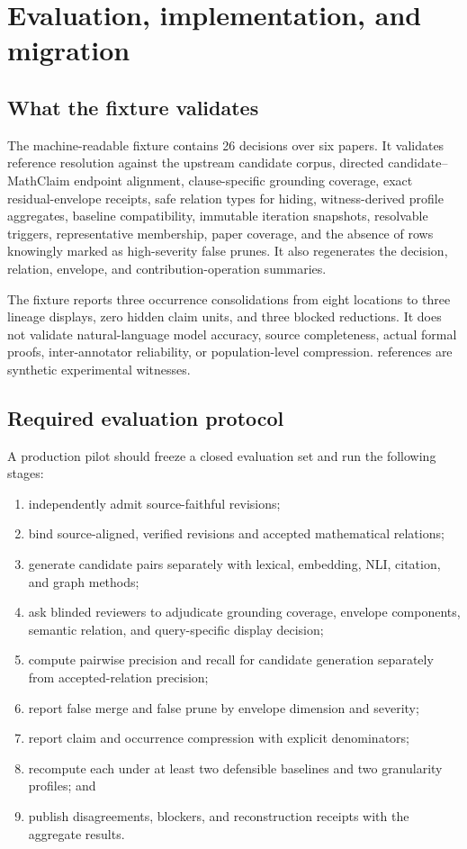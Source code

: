 \section{Evaluation, implementation, and migration}\label{sec:evaluation-migration}

\subsection{What the fixture validates}

The machine-readable fixture contains 26 decisions over six papers. It validates reference resolution against the upstream candidate corpus, directed candidate--MathClaim endpoint alignment, clause-specific grounding coverage, exact residual-envelope receipts, safe relation types for hiding, witness-derived profile aggregates, baseline compatibility, immutable iteration snapshots, resolvable triggers, representative membership, paper coverage, and the absence of rows knowingly marked as high-severity false prunes. It also regenerates the decision, relation, envelope, and contribution-operation summaries.

The fixture reports three occurrence consolidations from eight locations to three lineage displays, zero hidden claim units, and three blocked reductions. It does not validate natural-language model accuracy, source completeness, actual formal proofs, inter-annotator reliability, or population-level compression.  references are synthetic experimental witnesses.

\subsection{Required evaluation protocol}

A production pilot should freeze a closed evaluation set and run the following stages:
\begin{enumerate}
  \item independently admit source-faithful \ScientificClaim{} revisions;
  \item bind source-aligned, verified \MathClaim{} revisions and accepted mathematical relations;
  \item generate candidate pairs separately with lexical, embedding, NLI, citation, and graph methods;
  \item ask blinded reviewers to adjudicate grounding coverage, envelope components, semantic relation, and query-specific display decision;
  \item compute pairwise precision and recall for candidate generation separately from accepted-relation precision;
  \item report false merge and false prune by envelope dimension and severity;
  \item report claim and occurrence compression with explicit denominators;
  \item recompute each \ContributionProfile{} under at least two defensible baselines and two granularity profiles; and
  \item publish disagreements, blockers, and reconstruction receipts with the aggregate results.
\end{enumerate}


